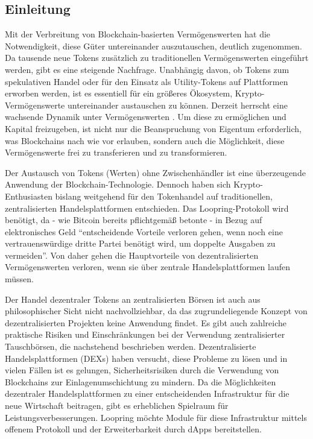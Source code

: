 \documentclass[UTF8,nofonts]{article}
\begin{document}
\begin{multicols}{2}
\section{Einleitung\label{sec:introduction}}
Mit der Verbreitung von Blockchain-basierten Vermögenswerten hat die Notwendigkeit, diese Güter untereinander auszutauschen, deutlich zugenommen. Da tausende neue Tokens zusätzlich zu traditionellen Vermögenswerten eingeführt werden, gibt es eine steigende Nachfrage. Unabhängig davon, ob Tokens zum spekulativen Handel oder für den Einsatz als Utility-Tokens auf Plattformen erworben werden, ist es essentiell für ein größeres Ökosystem, Krypto-Vermögenswerte untereinander austauschen zu können. Derzeit herrscht eine wachsende Dynamik unter Vermögenswerten \cite{desotocapital}. Um diese zu ermöglichen und Kapital freizugeben, ist nicht nur die Beanspruchung von Eigentum erforderlich, was Blockchains nach wie vor erlauben, sondern auch die Möglichkeit, diese Vermögenswerte frei zu transferieren und zu transformieren.

Der Austausch von Tokens (Werten) ohne Zwischenhändler ist eine überzeugende Anwendung der Blockchain-Technologie. Dennoch haben sich Krypto-Enthusiasten bislang weitgehend für den Tokenhandel auf traditionellen, zentralisierten Handelsplattformen entschieden. Das Loopring-Protokoll wird benötigt, da - wie Bitcoin \cite{nakamoto2008bitcoin} bereits pflichtgemäß betonte - in Bezug auf elektronisches Geld \enquote{entscheidende Vorteile verloren gehen, wenn noch eine vertrauenswürdige dritte Partei benötigt wird, um doppelte Ausgaben zu vermeiden}. Von daher gehen die Hauptvorteile von dezentralisierten Vermögenswerten verloren, wenn sie über zentrale Handelsplattformen laufen müssen.

Der Handel dezentraler Tokens an zentralisierten Börsen ist auch aus philosophischer Sicht nicht nachvollziehbar, da das zugrundeliegende Konzept von dezentralisierten Projekten keine Anwendung findet. Es gibt auch zahlreiche praktische Risiken und Einschränkungen bei der Verwendung zentralisierter Tauschbörsen, die nachstehend beschrieben werden. Dezentralisierte Handelsplattformen (DEXs) \cite{schuh2015bitshares} \cite{bancor} \cite{kyber} haben versucht, diese Probleme zu lösen und in vielen Fällen ist es gelungen, Sicherheitsrisiken durch die Verwendung von Blockchains zur Einlagenumschichtung zu mindern. Da die Möglichkeiten dezentraler Handelsplattformen zu einer entscheidenden Infrastruktur für die neue Wirtschaft beitragen, gibt es erheblichen Spielraum für Leistungsverbesserungen. Loopring möchte Module für diese Infrastruktur mittels offenem Protokoll und der Erweiterbarkeit durch dApps bereitstellen.


\end{multicols}
\end{document}
